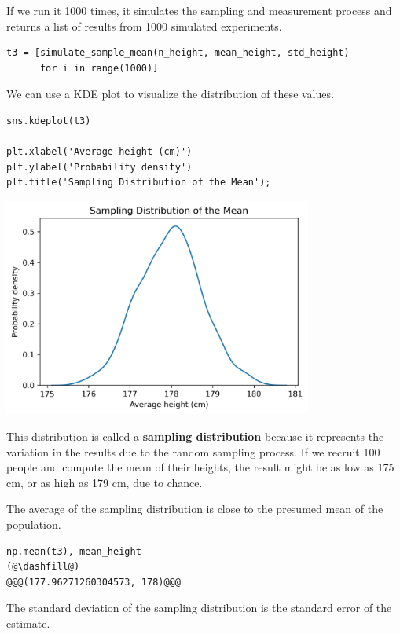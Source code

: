 If we run it 1000 times, it simulates the sampling and measurement
process and returns a list of results from 1000 simulated experiments.

\begin{lstlisting}[]
t3 = [simulate_sample_mean(n_height, mean_height, std_height)
      for i in range(1000)]
\end{lstlisting}

We can use a KDE plot to visualize the distribution of these values.

\begin{lstlisting}[]
sns.kdeplot(t3)

plt.xlabel('Average height (cm)')
plt.ylabel('Probability density')
plt.title('Sampling Distribution of the Mean');
\end{lstlisting}

\begin{center}
\includegraphics[width=4in]{11_resampling_files/11_resampling_60_0.png}
\end{center}

This distribution is called a \textbf{sampling distribution} because it
represents the variation in the results due to the random sampling
process. If we recruit 100 people and compute the mean of their heights,
the result might be as low as 175 cm, or as high as 179 cm, due to
chance.

The average of the sampling distribution is close to the presumed mean
of the population.

\begin{lstlisting}[]
np.mean(t3), mean_height
(@\dashfill@)
@@@(177.96271260304573, 178)@@@
\end{lstlisting}

The standard deviation of the sampling distribution is the standard
error of the estimate.

